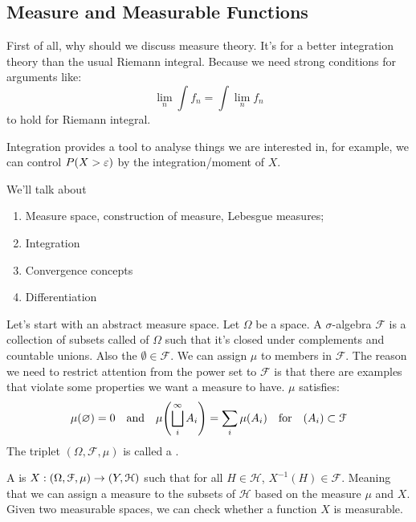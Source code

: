 \subsection{Measure and Measurable Functions}
First of all, why should we discuss measure theory. It's for a better integration theory than the usual Riemann integral. Because we need strong conditions for arguments like:
\begin{equation*}
    \lim_{n} \int f_{n} = \int \lim_{n} f_{n}
\end{equation*}
to hold for Riemann integral.

Integration provides a tool to analyse things we are interested in, for example, we can control \(P\pqty{X > \epsilon}\) by the integration/moment of \(X\). 

 We'll talk about
\begin{enumerate}
    \item Measure space, construction of measure, Lebesgue measures;
    \item Integration
    \item Convergence concepts 
    \item Differentiation 
\end{enumerate}

Let's start with an abstract measure space. Let \(\Omega\) be a space. A \(\sigma\)-algebra \(\mathcal{F}\) is a collection of subsets called  of \(\Omega\) such that it's closed under complements and countable unions. Also the \(\emptyset \in \mathcal{F}\). We can assign  \(\mu\) to members in \(\mathcal{F}\). The reason we need to restrict attention from the power set to \(\mathcal{F}\) is that there are examples that violate some properties we want a measure to have. \(\mu\) satisfies:
\begin{equation*}
    \mu\pqty{\emptyset} = 0 \qq{and} \mu \pqty{\sqcup_{i}^{\infty} A_{i}} = \sum_{i} \mu(A_{i}) \qq{for} (A_{i}) \subset \mathcal{F}
\end{equation*}
The triplet \((\Omega, \mathcal{F}, \mu)\) is called a .  

A  is \(X : (\Omega, \mathcal{F}, \mu) \to \pqty{Y, \mathcal{H}}\) such that for all \(H \in \mathcal{H}\), \(X^{-1}(H) \in \mathcal{F}\). Meaning that we can assign a measure to the subsets of \(\mathcal{H}\) based on the measure \(\mu\) and \(X\). 
Given two measurable spaces, we can check whether a function \(X\) is measurable. 


